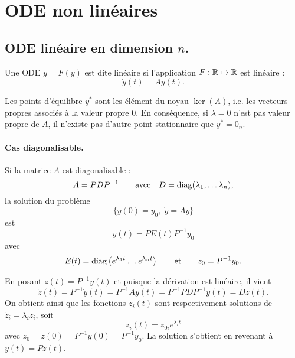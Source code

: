 \section{ODE non linéaires} \label{sec:EquaDiff-nonLineaire}

\subsection{ODE linéaire en dimension $n$.}

\begin{definition}
  Une ODE $\dot y = F(y)$ est dite linéaire si l'application $F : \mathbb{R} \mapsto \mathbb{R}$ est linéaire : 
  $$
  \dot y (t) = A y(t).
  $$
\end{definition}

\remark
Les points d'équilibre $y^*$ sont les élément du noyau $\ker(A)$, i.e. les vecteurs propres associés à la valeur propre 0. En conséquence, si $\lambda = 0$ n'est pas valeur propre de $A$, il n'existe pas d'autre point stationnaire que $y^* = 0_n$.

\paragraph*{Cas diagonalisable.}

\begin{proposition} \label{prop:odeLineaireDiagonalisable}
  Si la matrice $A$ est diagonalisable : 
  $$
  A = P D P^{-1}
  \qquad \text{avec}  \quad 
  D = \operatorname{diag}(\lambda_1, \dots \lambda_n),
  $$
  la solution du problème
  $$
  \{y(0) = y_0, \; \dot y = A y\}
  $$
  est
  $$
  y(t) = P E(t) P^{-1} y_0  
  $$
  avec
  $$
  E(t) = \operatorname{diag}\left(e^{\lambda_1 t} \dots e^{\lambda_n t} \right)
  \qquad \text{et} \qquad
  z_0 = P^{-1} y_0.
  $$
\end{proposition}

En posant $z(t) = P^{-1} y(t)$ et puisque la dérivation est linéaire, il vient 
$$
\dot z (t) = P^{-1} \dot y(t) = P^{-1} A y(t) = P^{-1} P D P^{-1} y(t) = D z(t).
$$
On obtient ainsi que les fonctions $z_i(t)$ sont respectivement solutions de $\dot z_i = \lambda_i z_i$, soit 
$$
z_i(t) = z_{0i} e^{\lambda_i t}
$$
avec $z_0 = z(0) = P^{-1} y(0) = P^{-1} y_0$. La solution s'obtient en revenant à $y(t) = P z(t)$.
\eproof

